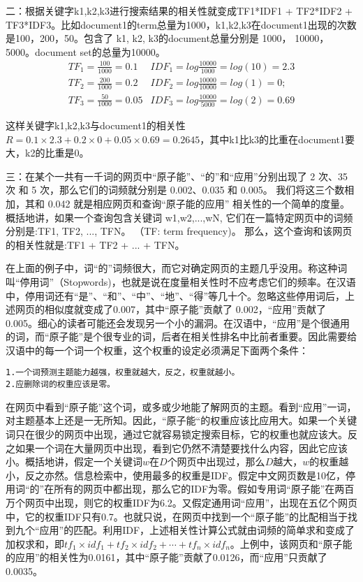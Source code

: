 \par 二：根据关键字k1,k2,k3进行搜索结果的相关性就变成TF1*IDF1 + TF2*IDF2 + TF3*IDF3。比如document1的term总量为1000，k1,k2,k3在document1出现的次数是100，200，50。包含了 k1, k2, k3的document总量分别是 1000， 10000，5000。document set的总量为10000。 
\begin{eqnarray*}
TF_1 = \frac{100}{1000} = 0.1 & IDF_1 = log\frac{10000}{1000} = log(10) = 2.3 \\
TF_2 = \frac{200}{1000} = 0.2 & IDF_2 = log\frac{10000}{10000} = log(1) = 0; \\
TF_3 = \frac{50}{1000} = 0.05 & IDF_3 = log\frac{10000}{5000} = log(2) = 0.69
\end{eqnarray*}
\par 这样关键字k1,k2,k3与document1的相关性$R=0.1\times 2.3 + 0.2\times 0 + 0.05\times 0.69 = 0.2645$，其中k1比k3的比重在document1要大，k2的比重是0。
\par 三：在某个一共有一千词的网页中“原子能”、“的”和“应用”分别出现了 2 次、35 次 和 5 次，那么它们的词频就分别是 0.002、0.035 和 0.005。 我们将这三个数相加，其和 0.042 就是相应网页和查询“原子能的应用” 相关性的一个简单的度量。概括地讲，如果一个查询包含关键词 w1,w2,...,wN, 它们在一篇特定网页中的词频分别是:TF1, TF2, ..., TFN。 （TF: term frequency)。 那么，这个查询和该网页的相关性就是:TF1 + TF2 + ... + TFN。
\par 在上面的例子中，词“的”词频很大，而它对确定网页的主题几乎没用。称这种词叫“停用词”（Stopwords)，也就是说在度量相关性时不应考虑它们的频率。在汉语中，停用词还有“是”、“和”、“中”、“地”、“得”等几十个。忽略这些停用词后，上述网页的相似度就变成了0.007，其中“原子能”贡献了 0.002，“应用”贡献了 0.005。细心的读者可能还会发现另一个小的漏洞。在汉语中，“应用”是个很通用的词，而“原子能”是个很专业的词，后者在相关性排名中比前者重要。因此需要给汉语中的每一个词一个权重，这个权重的设定必须满足下面两个条件：
\begin{verbatim}
1.一个词预测主题能力越强，权重就越大，反之，权重就越小。
2.应删除词的权重应该是零。
\end{verbatim}
\par 在网页中看到“原子能”这个词，或多或少地能了解网页的主题。看到“应用”一词，对主题基本上还是一无所知。因此，“原子能“的权重应该比应用大。如果一个关键词只在很少的网页中出现，通过它就容易锁定搜索目标，它的权重也就应该大。反之如果一个词在大量网页中出现，看到它仍然不清楚要找什么内容，因此它应该小。概括地讲，假定一个关键词$w$在$D$个网页中出现过，那么$D$越大，$w$的权重越小，反之亦然。信息检索中，使用最多的权重是IDF。假定中文网页数是10亿，停用词“的”在所有的网页中都出现，那么它的IDF为零。假如专用词“原子能”在两百万个网页中出现，则它的权重IDF为6.2。又假定通用词“应用”，出现在五亿个网页中，它的权重IDF只有0.7。也就只说，在网页中找到一个“原子能”的比配相当于找到九个“应用”的匹配。利用IDF，上述相关性计算公式就由词频的简单求和变成了加权求和，即$tf_1\times idf_1+tf_2\times idf_2+ \cdots+tf_n\times idf_n$。上例中，该网页和“原子能的应用”的相关性为0.0161，其中“原子能”贡献了0.0126，而“应用”只贡献了0.0035。
